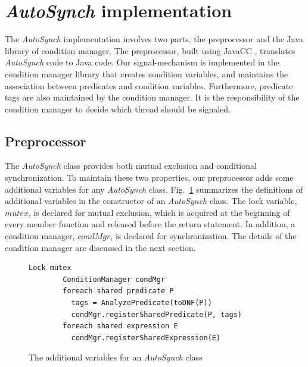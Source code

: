 \documentclass{sigplanconf}
\begin{document}
\section{{\em AutoSynch} implementation} \label{sec:imp}
The {\em AutoSynch} implementation involves two parts, the preprocessor and the 
Java library of condition manager. The preprocessor,  built using JavaCC
\cite{kod04}, translates  {\em AutoSynch} code to Java code. Our
signal-mechanism is implemented in the condition manager library that creates 
condition variables, and maintains the association between predicates and 
condition variables. Furthermore, predicate tags are also maintained by the 
condition manager. It is the responsibility of the condition manager to decide 
which thread should be signaled. 

\subsection{Preprocessor}
The {\em AutoSynch} class provides both mutual exclusion and conditional
synchronization. To maintain these two properties, our preprocessor adds some 
additional variables for any {\em AutoSynch} class. Fig.~\ref{fig:pre_cnst} 
summarizes the definitions of additional variables in the
constructor of an {\em AutoSynch} class. The lock 
variable, $mutex$, is declared for mutual exclusion, which is acquired at the 
beginning of every member function and released before the return statement.
In addition, a condition manager, $condMgr$, is declared for synchronization. 
The details of the condition manager are discussed in the next
section.  


\begin{figure}[ht!]
    \begin{Verbatim}[fontsize=\footnotesize,gobble=8,frame=lines,
            framesep=3mm]
        Lock mutex
        ConditionManager condMgr 
        foreach shared predicate P
          tags = AnalyzePredicate(toDNF(P))
          condMgr.registerSharedPredicate(P, tags)
        foreach shared expression E
          condMgr.registerSharedExpression(E)
    \end{Verbatim}
  \caption{The additional variables for an {\em AutoSynch} class}
  \label{fig:pre_cnst}
\end{figure}
\end{document}
